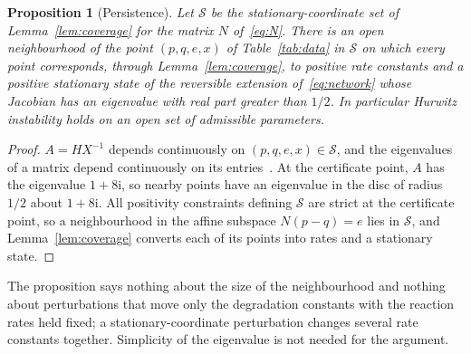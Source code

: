 \documentclass[11pt,a4paper]{article}
\theoremstyle{plain}
\newtheorem{proposition}[theorem]{Proposition}
\theoremstyle{definition}
\theoremstyle{remark}
\numberwithin{equation}{section}
\newcommand{\iu}{\mathrm{i}}
\begin{document}
\begin{proposition}[Persistence]\label{prop:persist}
Let $\mathcal S$ be the stationary-coordinate set of Lemma~\ref{lem:coverage} for the matrix $N$ of~\eqref{eq:N}. There is an open neighbourhood of the point $(p,q,e,x)$ of Table~\ref{tab:data} in $\mathcal S$ on which every point corresponds, through Lemma~\ref{lem:coverage}, to positive rate constants and a positive stationary state of the reversible extension of~\eqref{eq:network} whose Jacobian has an eigenvalue with real part greater than $1/2$. In particular Hurwitz instability holds on an open set of admissible parameters.
\end{proposition}

\begin{proof}
$A=HX^{-1}$ depends continuously on $(p,q,e,x)\in\mathcal S$, and the eigenvalues of a matrix depend continuously on its entries~\cite[Appendix~D]{HJ13}. At the certificate point, $A$ has the eigenvalue $1+8\iu$, so nearby points have an eigenvalue in the disc of radius $1/2$ about $1+8\iu$. All positivity constraints defining $\mathcal S$ are strict at the certificate point, so a neighbourhood in the affine subspace $N(p-q)=e$ lies in $\mathcal S$, and Lemma~\ref{lem:coverage} converts each of its points into rates and a stationary state.
\end{proof}

The proposition says nothing about the size of the neighbourhood and nothing about perturbations that move only the degradation constants with the reaction rates held fixed; a stationary-coordinate perturbation changes several rate constants together. Simplicity of the eigenvalue is not needed for the argument.
\end{document}
